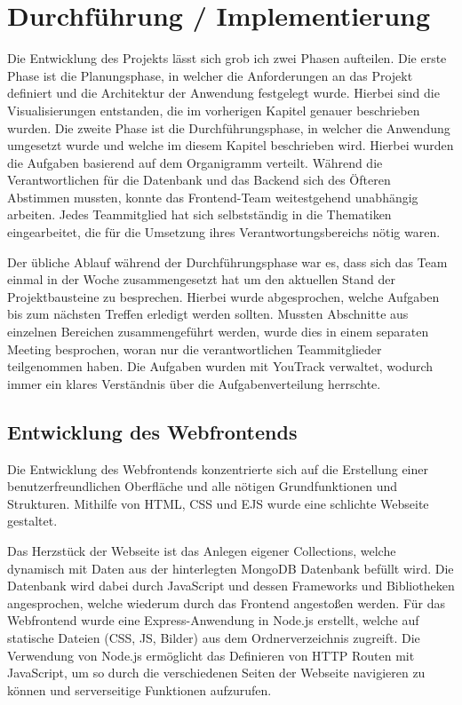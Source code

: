 \section{Durchführung / Implementierung}\label{sec:durchfuehrung-implementierung}

Die Entwicklung des Projekts lässt sich grob ich zwei Phasen aufteilen.
Die erste Phase ist die Planungsphase, in welcher die Anforderungen an das Projekt definiert und die Architektur der Anwendung festgelegt wurde.
Hierbei sind die Visualisierungen entstanden, die im vorherigen Kapitel genauer beschrieben wurden.
Die zweite Phase ist die Durchführungsphase, in welcher die Anwendung umgesetzt wurde und welche im diesem Kapitel beschrieben wird.
Hierbei wurden die Aufgaben basierend auf dem Organigramm verteilt.
Während die Verantwortlichen für die Datenbank und das Backend sich des Öfteren Abstimmen mussten, konnte das Frontend-Team weitestgehend unabhängig arbeiten.
Jedes Teammitglied hat sich selbstständig in die Thematiken eingearbeitet, die für die Umsetzung ihres Verantwortungsbereichs nötig waren.

Der übliche Ablauf während der Durchführungsphase war es, dass sich das Team einmal in der Woche zusammengesetzt hat um den aktuellen Stand der Projektbausteine zu besprechen.
Hierbei wurde abgesprochen, welche Aufgaben bis zum nächsten Treffen erledigt werden sollten.
Mussten Abschnitte aus einzelnen Bereichen zusammengeführt werden, wurde dies in einem separaten Meeting besprochen, woran nur die verantwortlichen Teammitglieder teilgenommen haben.
Die Aufgaben wurden mit YouTrack verwaltet, wodurch immer ein klares Verständnis über die Aufgabenverteilung herrschte.

\subsection{Entwicklung des Webfrontends}\label{subsec:entwicklung-des-webfrontends}
Die Entwicklung des Webfrontends konzentrierte sich auf die Erstellung einer benutzerfreundlichen Oberfläche und alle nötigen Grundfunktionen und Strukturen.
Mithilfe von HTML, CSS und EJS wurde eine schlichte Webseite gestaltet.

Das Herzstück der Webseite ist das Anlegen eigener Collections, welche dynamisch mit Daten aus der hinterlegten MongoDB Datenbank befüllt wird.
Die Datenbank wird dabei durch JavaScript und dessen Frameworks und Bibliotheken angesprochen, welche wiederum durch das Frontend angestoßen werden.
Für das Webfrontend wurde eine Express-Anwendung in Node.js erstellt, welche auf statische Dateien (CSS, JS, Bilder) aus dem Ordnerverzeichnis zugreift.
Die Verwendung von Node.js ermöglicht das Definieren von HTTP Routen mit JavaScript, um so durch die verschiedenen Seiten der Webseite navigieren zu können und serverseitige Funktionen aufzurufen.

